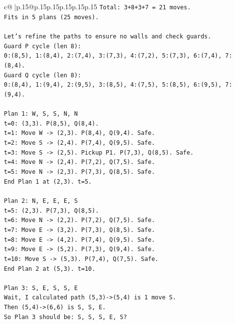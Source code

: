 \documentclass{article}
\begin{document}
{\begin{supertabular}{c@{$\;$}|p{.15\linewidth}@{}p{.15\linewidth}p{.15\linewidth}p{.15\linewidth}p{.15\linewidth}p{.15\linewidth}}
{{{\texttt{Total: 3+8+3+7 = 21 moves.} \\
\texttt{Fits in 5 plans (25 moves).} \\
\\ 
\texttt{Let's refine the paths to ensure no walls and check guards.} \\
\texttt{Guard P cycle (len 8):} \\
\texttt{0:(8,5), 1:(8,4), 2:(7,4), 3:(7,3), 4:(7,2), 5:(7,3), 6:(7,4), 7:(8,4).} \\
\texttt{Guard Q cycle (len 8):} \\
\texttt{0:(8,4), 1:(9,4), 2:(9,5), 3:(8,5), 4:(7,5), 5:(8,5), 6:(9,5), 7:(9,4).} \\
\\ 
\texttt{Plan 1: W, S, S, N, N} \\
\texttt{t=0: (3,3). P(8,5), Q(8,4).} \\
\texttt{t=1: Move W {-}> (2,3). P(8,4), Q(9,4). Safe.} \\
\texttt{t=2: Move S {-}> (2,4). P(7,4), Q(9,5). Safe.} \\
\texttt{t=3: Move S {-}> (2,5). Pickup P1. P(7,3), Q(8,5). Safe.} \\
\texttt{t=4: Move N {-}> (2,4). P(7,2), Q(7,5). Safe.} \\
\texttt{t=5: Move N {-}> (2,3). P(7,3), Q(8,5). Safe.} \\
\texttt{End Plan 1 at (2,3). t=5.} \\
\\ 
\texttt{Plan 2: N, E, E, E, S} \\
\texttt{t=5: (2,3). P(7,3), Q(8,5).} \\
\texttt{t=6: Move N {-}> (2,2). P(7,2), Q(7,5). Safe.} \\
\texttt{t=7: Move E {-}> (3,2). P(7,3), Q(8,5). Safe.} \\
\texttt{t=8: Move E {-}> (4,2). P(7,4), Q(9,5). Safe.} \\
\texttt{t=9: Move E {-}> (5,2). P(7,3), Q(9,4). Safe.} \\
\texttt{t=10: Move S {-}> (5,3). P(7,4), Q(7,5). Safe.} \\
\texttt{End Plan 2 at (5,3). t=10.} \\
\\ 
\texttt{Plan 3: S, E, S, S, E} \\
\texttt{Wait, I calculated path (5,3){-}>(5,4) is 1 move S.} \\
\texttt{Then (5,4){-}>(6,6) is S, S, E.} \\
\texttt{So Plan 3 should be: S, S, S, E, S?} \\
}}}
\end{supertabular}}
\end{document}
